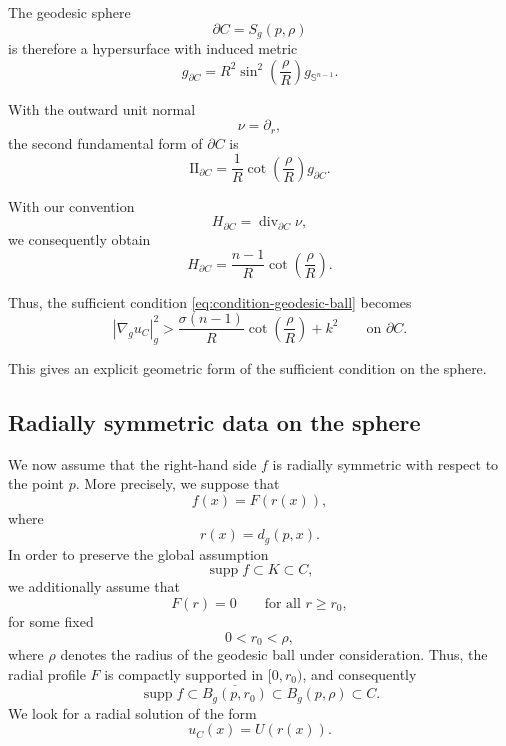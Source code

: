 \documentclass{article}
\renewcommand{\boxed}[1]{#1}
\begin{document}
The geodesic sphere
\[
\partial C=S_g(p,\rho)
\]
is therefore a hypersurface with induced metric
\begin{equation}
g_{\partial C}
=
R^2\sin^2\left(\frac{\rho}{R}\right)
g_{\mathbb{S}^{n-1}}.
\label{eq:induced-sphere-metric}
\end{equation}

With the outward unit normal
\[
\nu=\partial_r,
\]
the second fundamental form of $\partial C$ is
\begin{equation}
\mathrm{II}_{\partial C}
=
\frac{1}{R}
\cot\left(\frac{\rho}{R}\right)
g_{\partial C}.
\label{eq:second-fundamental-sphere}
\end{equation}

With our convention
\[
H_{\partial C}
=
\operatorname{div}_{\partial C}\nu,
\]
we consequently obtain
\begin{equation}
\boxed{
H_{\partial C}
=
\frac{n-1}{R}
\cot\left(\frac{\rho}{R}\right).
}
\label{eq:mean-curvature-sphere}
\end{equation}

Thus, the sufficient condition
\eqref{eq:condition-geodesic-ball} becomes
\begin{equation}
\boxed{
|\nabla_g u_C|_g^2
>
\frac{\sigma(n-1)}{R}
\cot\left(\frac{\rho}{R}\right)
+
k^2
\qquad\text{on }\partial C.
}
\label{eq:sufficient-sphere}
\end{equation}

This gives an explicit geometric form of the sufficient condition on
the sphere.

\subsection{Radially symmetric data on the sphere}
\label{subsec:radial-sphere}

We now assume that the right-hand side $f$ is radially symmetric with
respect to the point $p$. More precisely, we suppose that
\begin{equation}
f(x)=F(r(x)),
\label{eq:radial-f}
\end{equation}
where
\[
r(x)=d_g(p,x).
\]
In order to preserve the global assumption
\[
\operatorname{supp} f\subset K\subset C,
\]
we additionally assume that
\[
F(r)=0
\qquad\text{for all }r\ge r_0,
\]
for some fixed
\[
0<r_0<\rho,
\]
where $\rho$ denotes the radius of the geodesic ball under
consideration. Thus, the radial profile $F$ is compactly supported in
$[0,r_0)$, and consequently
\[
\operatorname{supp}f\subset \overline{B_g(p,r_0)}
\subset B_g(p,\rho)\subset C.
\]
We look for a radial solution of the form
\begin{equation}
u_C(x)=U(r(x)).
\label{eq:radial-u}
\end{equation}
\end{document}

